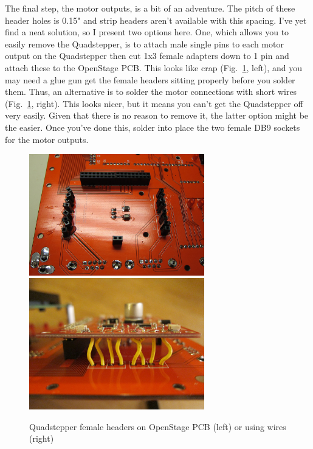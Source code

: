 \documentclass[11pt]{report} %
\begin{document}
The final step, the motor outputs, is a bit of an adventure. The pitch of these header holes is 0.15" and strip headers aren't available with this spacing. I've yet find a neat solution, so I present two options here. One, which allows you to easily remove the Quadstepper, is to attach male single pins to each motor output on the Quadstepper then cut 1x3 female adapters down to 1 pin and attach these to the OpenStage PCB. This looks like crap (Fig.~\ref{motoroutputs}, left), and you may need a glue gun get the female headers sitting properly before you solder them. Thus, an alternative is to solder the motor connections with short wires (Fig.~\ref{motoroutputs}, right). This looks nicer, but it means you can't get the Quadstepper off very easily. Given that there is no reason to remove it, the latter option might be the easier. Once you've done this, solder into place the two female DB9 sockets for the motor outputs. 


\begin{figure}[!ht]
\centering
\includegraphics[width=3in]{IMG_3211.JPG}
\includegraphics[width=3in]{IMG_3232.JPG}
\caption{Quadstepper female headers on OpenStage PCB (left) or using wires (right) }
\label{motoroutputs}
\end{figure}


\clearpage
\end{document}
